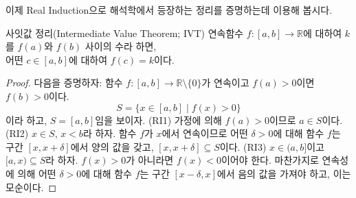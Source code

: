 \documentclass[serif]{beamer}
\begin{document}
\begin{frame}{}
    이제 Real Induction으로 해석학에서 등장하는 정리를 증명하는데 이용해 봅시다.
    \begin{thm*}{사잇값 정리(Intermediate Value Theorem; IVT)}
        연속함수 $f:[a,b]\to\mathbb R$에 대하여 $k$를 $f(a)$와 $f(b)$ 사이의 수라 하면, \\
        어떤 $c\in[a,b]$에 대하여 $f(c)=k$이다.
    \end{thm*}
    \begin{proof}
        다음을 증명하자: 함수 $f:[a,b]\to\mathbb R\setminus\{0\}$가 연속이고 $f(a)>0$이면 $f(b)>0$이다.
        \[
            S=\{x\in[a,b]\mid f(x)>0\}
        \]
        이라 하고, $S=[a,b]$임을 보이자. (RI1) 가정에 의해 $f(a)>0$이므로 $a\in S$이다. \\ (RI2) $x\in S$, $x<b$라 하자.
        함수 $f$가 $x$에서 연속이므로 어떤 $\delta>0$에 대해 함수 $f$는 구간 $[x,x+\delta]$에서 양의 값을 갖고, $[x,x+\delta]\subseteq S$이다.
        (RI3) $x\in(a,b]$이고 $[a,x)\subseteq S$라 하자. $f(x)>0$가 아니라면 $f(x)<0$이어야 한다. 마찬가지로 연속성에 의해
        어떤 $\delta>0$에 대해 함수 $f$는 구간 $[x-\delta,x]$에서 음의 값을 가져야 하고, 이는 모순이다.
    \end{proof}
\end{frame}
\end{document}
